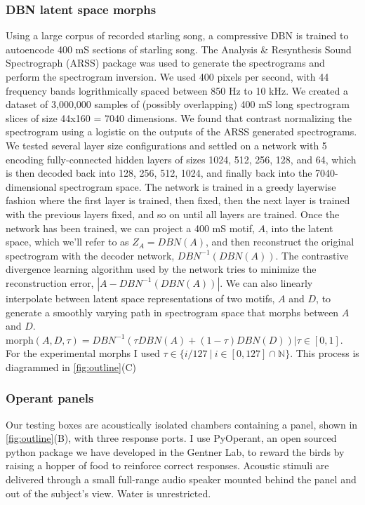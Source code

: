 \subsubsection{\ac{DBN} latent space morphs}
Using a large corpus of recorded starling song, a compressive \ac{DBN} \cite{hinton2006reducing} is trained to autoencode 400 mS sections of starling song. The Analysis \& Resynthesis Sound Spectrograph (ARSS) package was used to generate the spectrograms and perform the spectrogram inversion. We used 400 pixels per second, with 44 frequency bands logrithmically spaced between 850 Hz to 10 kHz. We created a dataset of 3,000,000 samples of (possibly overlapping) 400 mS long spectrogram slices of size 44x160 = 7040 dimensions. We found that contrast normalizing the spectrogram using a logistic on the outputs of the ARSS generated spectrograms. We tested several layer size configurations and settled on a network with 5 encoding fully-connected hidden layers of sizes 1024, 512, 256, 128, and 64, which is then decoded back into 128, 256, 512, 1024, and finally back into the 7040-dimensional spectrogram space. The network is trained in a greedy layerwise fashion where the first layer is trained, then fixed, then the next layer is trained with the previous layers fixed, and so on until all layers are trained. Once the network has been trained, we can project a 400 mS motif, $A$, into the latent space, which we'll refer to as $Z_A = DBN(A)$, and then reconstruct the original spectrogram with the decoder network, $DBN^{-1}(DBN(A))$. The contrastive divergence learning algorithm used by the network tries to minimize the reconstruction error, $|A - DBN^{-1}(DBN(A))|$. We can also linearly interpolate between latent space representations of two motifs, $A$ and $D$, to generate a smoothly varying path in spectrogram space that morphs between $A$ and $D$. $\text{morph}(A, D, \tau) = DBN^{-1}(\tau DBN(A) + (1 - \tau) DBN(D)) | \tau \in [0, 1]$. For the experimental morphs I used $\tau \in \{ i/127\ |\ i \in [0, 127] \cap \mathbb{N}\}$. This process is diagrammed in \ref{fig:outline}(C)

\subsubsection{Operant panels}
Our testing boxes are acoustically isolated chambers containing a panel, shown in \ref{fig:outline}(B), with three response ports. I use PyOperant, an open sourced python package we have developed in the Gentner Lab, to reward the birds by raising a hopper of food to reinforce correct responses. Acoustic stimuli are delivered through a small full-range audio speaker mounted behind the panel and out of the subject's view. Water is unrestricted.

